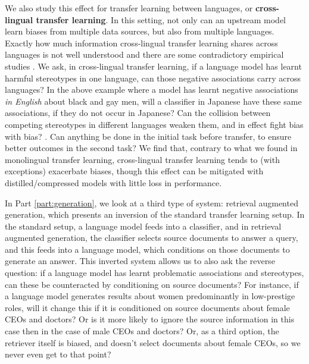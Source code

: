 We also study this effect for transfer learning between languages, or \textbf{cross-lingual transfer learning}. In this setting, not only can an upstream model learn biases from multiple data sources, but also from multiple languages. Exactly how much information cross-lingual transfer learning shares across languages is not well understood and there are some contradictory empirical studies \citep{conneau-etal-2020-unsupervised, artetxe-etal-2020-cross}.
We ask, in cross-lingual transfer learning, if a language model has learnt harmful stereotypes in one language, can those negative associations carry across languages? In the above example where a model has learnt negative associations \textit{in English} about black and gay men, will a classifier in Japanese have these same associations, if they do not occur in Japanese? Can the collision between competing stereotypes in different languages weaken them, and in effect fight bias with bias? \citep{stanovsky-etal-2019-evaluating}. Can anything be done in the initial task before transfer, to ensure better outcomes in the second task? We find that, contrary to what we found in monolingual transfer learning, cross-lingual transfer learning tends to (with exceptions) exacerbate biases, though this effect can be mitigated with distilled/compressed models with little loss in performance. 

In Part \ref{part:generation}, we look at a third type of system: retrieval augmented generation, which presents an inversion of the standard transfer learning setup. In the standard setup,  a language model feeds into a classifier, and in retrieval augmented generation, the classifier selects source documents to answer a query, and this feeds into a language model, which conditions on those documents to generate an answer. This inverted system allows us to also ask the reverse question: if a language model has learnt problematic associations and stereotypes, can these be counteracted by conditioning on source documents? For instance, if a language model generates results about women predominantly in low-prestige roles, will it change this if it is conditioned on source documents about female CEOs and doctors? Or is it more likely to ignore the source information in this case then in the case of male CEOs and doctors? Or, as a third option, the retriever itself is biased, and doesn't select documents about female CEOs, so we never even get to that point?


